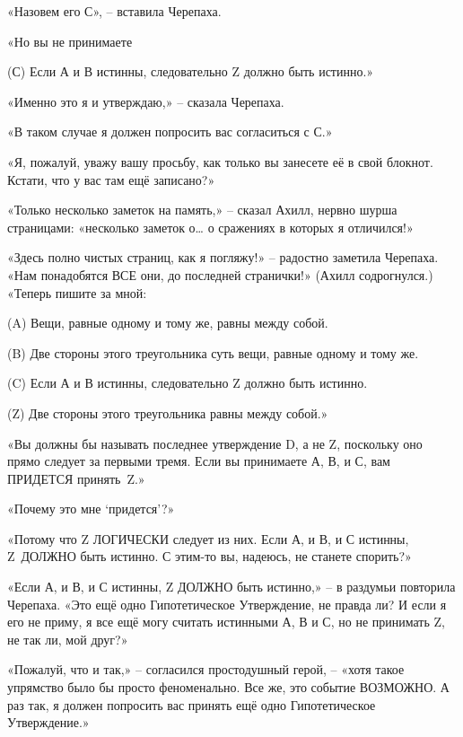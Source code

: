 \documentclass[../main.tex]{subfiles}
\begin{document}
\begin{Dialogue}
«Назовем его С», \--- вставила Черепаха.

«Но вы не принимаете

\begin{statements}
    \item[(С)] Если А и В истинны, следовательно Z должно быть истинно.»
\end{statements}

«Именно это я и утверждаю,» \--- сказала Черепаха.

«В таком случае я должен попросить вас согласиться с С.»

«Я, пожалуй, уважу вашу просьбу, как только вы занесете её в свой блокнот. Кстати, что у вас там ещё записано?»

«Только несколько заметок на память,» \--- сказал Ахилл, нервно шурша страницами: «несколько заметок о\ldots{} о сражениях в которых я отличился!»

«Здесь полно чистых страниц, как я погляжу!» \--- радостно заметила Черепаха. «Нам понадобятся ВСЕ они, до последней странички!» (Ахилл содрогнулся.) «Теперь пишите за мной:

\begin{statements}
    \item[(A)] Вещи, равные одному и тому же, равны между собой.
    \item[(B)] Две стороны этого треугольника суть вещи, равные одному и тому же.
    \item[(C)] Если А и В истинны, следовательно Z должно быть истинно.
    \item[(Z)] Две стороны этого треугольника равны между собой.»
\end{statements}

«Вы должны бы называть последнее утверждение D, а не Z, поскольку оно прямо следует за первыми тремя. Если вы принимаете А, В, и С, вам ПРИДЕТСЯ принять~Z.»

«Почему это мне \enquote*{придется}?»

«Потому что Z ЛОГИЧЕСКИ следует из них. Если А, и В, и С истинны, Z~ДОЛЖНО быть истинно. С этим-то вы, надеюсь, не станете спорить?»

«Если А, и В, и С истинны, Z ДОЛЖНО быть истинно,» \--- в раздумьи повторила Черепаха. «Это ещё одно Гипотетическое Утверждение, не правда ли? И если я его не приму, я все ещё могу считать истинными А, В и С, но не принимать Z, не так ли, мой друг?»

«Пожалуй, что и так,» \--- согласился простодушный герой, \--- «хотя такое упрямство было бы просто феноменально. Все же, это событие ВОЗМОЖНО\@. А раз так, я должен попросить вас принять ещё одно Гипотетическое Утверждение.»


\end{Dialogue}
\end{document}
